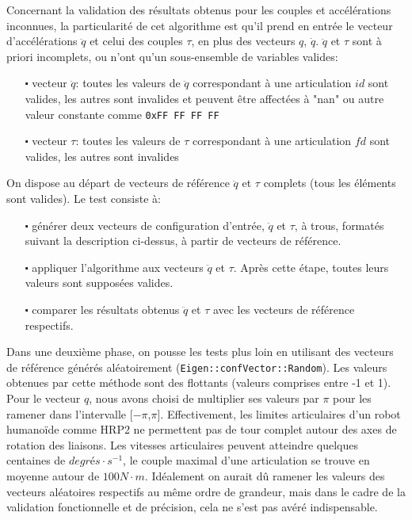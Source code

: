 \documentclass{report}
\begin{document}
Concernant la validation des résultats obtenus pour les couples et accélérations inconnues, la particularité de cet algorithme est qu'il prend en entrée le vecteur d'accélérations $\ddot{q}$ et celui des couples $\tau$, en plus des vecteurs $q$, $\dot{q}$. $\ddot{q}$ et $\tau$ sont à priori incomplets, ou n'ont qu'un sous-ensemble de variables valides:
\begin{itemize}
\item[$\centerdot$ vecteur $\ddot{q}$:] toutes les valeurs de $\ddot{q}$ correspondant à une articulation $id$ sont valides, les autres sont invalides et peuvent être affectées à "nan" ou autre valeur constante comme \verb;0xFF FF FF FF;
\item[$\centerdot$ vecteur $\tau$:] toutes les valeurs de $\tau$ correspondant à une articulation $fd$ sont valides, les autres sont invalides
\end{itemize}
On dispose au départ de vecteurs de référence $\ddot{q}$ et $\tau$ complets (tous les éléments sont valides). Le test consiste à:
\begin{itemize}
\item[$\centerdot$] générer deux vecteurs de configuration d'entrée, $\ddot{q}$ et $\tau$, à trous, formatés suivant la description ci-dessus, à partir de vecteurs de référence.
\item[$\centerdot$] appliquer l'algorithme aux vecteurs $\ddot{q}$ et $\tau$. Après cette étape, toutes leurs valeurs sont supposées valides.
\item[$\centerdot$] comparer les résultats obtenus $\ddot{q}$ et $\tau$ avec les vecteurs de référence respectifs.
\end{itemize}

Dans une deuxième phase, on pousse les tests plus loin en utilisant des vecteurs de référence générés aléatoirement (\verb;Eigen::confVector::Random;). Les valeurs obtenues par cette méthode sont des flottants (valeurs comprises entre -1 et 1). Pour le vecteur $q$, nous avons choisi de multiplier ses valeurs par $\pi$ pour les ramener dans l'intervalle [$-\pi$,$\pi$]. Effectivement, les limites articulaires d'un robot humanoïde comme HRP2 ne permettent pas de tour complet autour des axes de rotation des liaisons. Les vitesses articulaires peuvent atteindre quelques centaines de $degrés \cdot s^{-1}$, le couple maximal d'une articulation se trouve en moyenne autour de $100 N \cdot m$. Idéalement on aurait dû ramener les valeurs des vecteurs aléatoires respectifs au même ordre de grandeur, mais dans le cadre de la validation fonctionnelle et de précision, cela ne s'est pas avéré indispensable.
\end{document}
